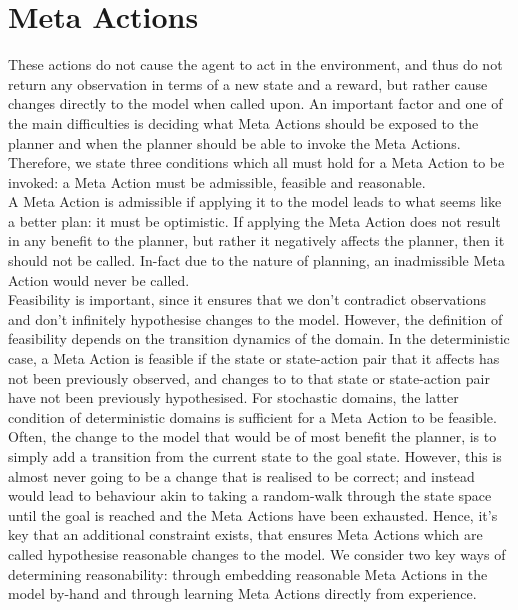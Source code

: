 \section{Meta Actions}
These actions do not cause the agent to act in the environment, and thus do not return any observation in terms of a new state and a reward, but rather cause changes directly to the model when called upon. An important factor and one of the main difficulties is deciding what Meta Actions should be exposed to the planner and when the planner should be able to invoke the Meta Actions. Therefore, we state three conditions which all must hold for a Meta Action to be invoked: a Meta Action must be admissible, feasible and reasonable.
\\A Meta Action is admissible if applying it to the model leads to what seems like a better plan: it must be optimistic. If applying the Meta Action does not result in any benefit to the planner, but rather it negatively affects the planner, then it should not be called. In-fact due to the nature of planning, an inadmissible Meta Action would never be called.\\Feasibility is important, since it ensures that we don't contradict observations and don't infinitely hypothesise changes to the model. However, the definition of feasibility depends on the transition dynamics of the domain. In the deterministic case, a Meta Action is feasible if the state or state-action pair that it affects has not been previously observed, and changes to to that state or state-action pair have not been previously hypothesised.
For stochastic domains, the latter condition of deterministic domains is sufficient for a Meta Action to be feasible.
\\Often, the change to the model that would be of most benefit the planner, is to simply add a transition from the current state to the goal state. However, this is almost never going to be a change that is realised to be correct; and instead would lead to behaviour akin to taking a random-walk through the state space until the goal is reached and the Meta Actions have been exhausted. Hence, it's key that an additional constraint exists, that ensures Meta Actions which are called hypothesise reasonable changes to the model. We consider two key ways of determining reasonability: through embedding reasonable Meta Actions in the model by-hand and through learning Meta Actions directly from experience.

